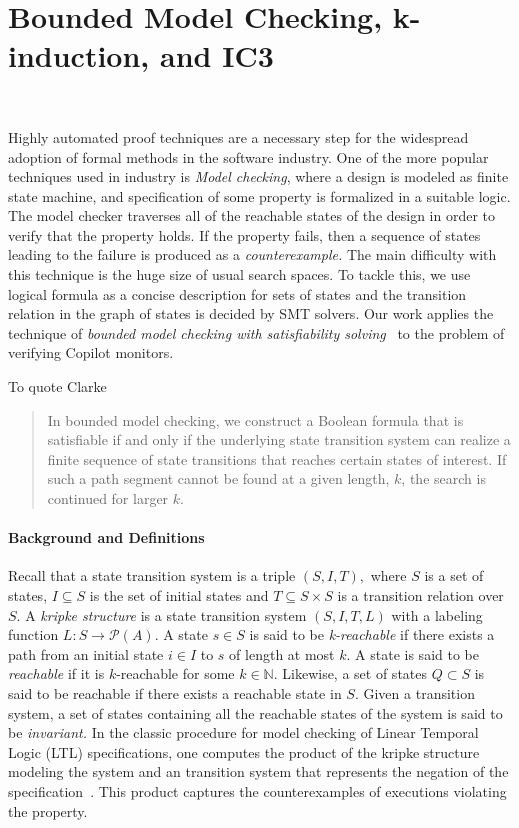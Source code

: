 \section{Bounded Model Checking,  k-induction, and IC3}~\label{sec:mck}





Highly automated proof techniques are a necessary step for the
widespread adoption of formal methods in the software industry.
 One of the more popular techniques used in industry is {\em Model
  checking}, where a design is modeled as finite state machine, and
specification of some property is formalized in a suitable logic.  The
model checker traverses all of the 
reachable states of the design in order to verify that the property
holds.  If the property fails, then a sequence of states leading to
the failure is produced as a {\em counterexample.} The main difficulty
with this technique is the huge size of usual search spaces. To tackle
this, we use logical formula as a concise description for sets of
states and the transition relation in the graph of states is decided
by SMT solvers.  Our work applies
the technique of {\em bounded model checking with satisfiability
  solving}~\cite{ClarkeBounded01,ClarkeBounded03} to the problem of
verifying Copilot monitors.

To quote Clarke~\cite{ClarkeBounded01}
\begin{quote}
  In bounded model checking, we construct a Boolean formula that is
  satisfiable if and only if the underlying state transition system
  can realize a finite sequence of state transitions that reaches
  certain states of interest. If such a path segment cannot be found
  at a given length, $k$, the search is continued for larger $k.$
\end{quote} 


\paragraph{Background and Definitions} Recall that a state transition system is a triple $(S,I,T),$
where $S$ is a set of states, $I \subseteq S$ is the set of initial
states and $T \subseteq S \times S $ is a transition relation over $S.$ A {\em kripke
  structure} is a state transition system $(S,I,T,L)$  with a labeling function
$L: S \rightarrow  \mathcal{P}(A)$.  A state $s 
\in S$ is said to be {\em k-reachable} if there exists a path from an
initial state $i\in I$ to $s$ of length at most $k.$ A state is said
to be {\em reachable} if it is $k$-reachable for some $k\in \mathbb{N}.$
Likewise, a set of states $Q \subset S$ is said to be reachable if
there exists a reachable state in $S.$  Given a transition system, a
set of states containing all the reachable states of the system is
said to be {\em invariant.} In the classic procedure for model checking of Linear
Temporal Logic (LTL) specifications, one computes the product of
the kripke structure modeling the system and an transition system that
represents the negation of the specification~\cite{ClarkeMC}. This product captures
the counterexamples of executions violating the property. 

